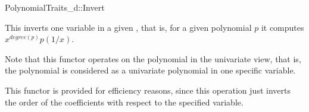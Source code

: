 \begin{ccRefConcept}{PolynomialTraits_d::Invert}
\ccDefinition

This  inverts one variable in a given
, that is, for a given polynomial 
$p$ it computes $x^{degree(p)}p(1/x)$. 

Note that this functor operates on the polynomial in the univariate view, that is, 
the polynomial is considered as a univariate polynomial in one specific variable. 

This functor is provided for efficiency reasons, since this operation just inverts the 
order of the coefficients with respect to the specified variable. 



\ccRefines 
{}

\ccTypes

\ccGlue
{}

\ccOperations
{}



\ccSeeAlso

\\
\\

\end{ccRefConcept}
